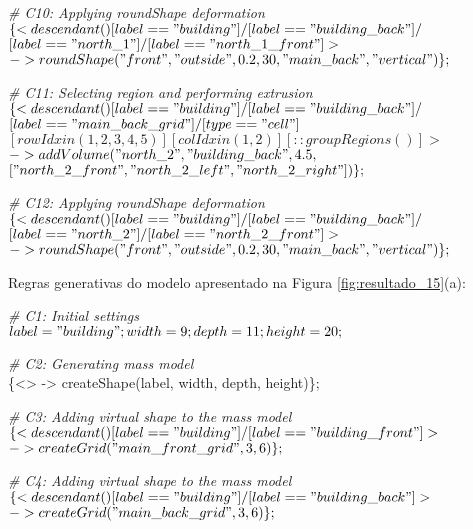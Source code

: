 \noindent \textit{\# C10: Applying roundShape deformation}\\
$\{< descendant() [label=="building"] / [label=="building\_back"] / $\\
$[label=="north\_1"] / [label=="north\_1\_front"] > $\\
$-> roundShape("front", "outside", 0.2, 30, "main\_back", "vertical")\};$

\noindent \textit{\# C11: Selecting region and performing extrusion}\\
$\{< descendant() [label=="building"] / [label=="building\_back"] / $\\
$[label=="main\_back\_grid"] / [type=="cell"] $\\
$[rowIdx in (1, 2, 3, 4, 5)] [colIdx in (1, 2)] [::groupRegions()] > $\\
$-> addVolume("north\_2", "building\_back", 4.5, $\\
$["north\_2\_front", "north\_2\_left", "north\_2\_right"])\};$

\noindent \textit{\# C12: Applying roundShape deformation}\\
$\{< descendant() [label=="building"] / [label=="building\_back"] / $\\
$[label=="north\_2"] / [label=="north\_2\_front"] > $\\
$-> roundShape("front", "outside", 0.2, 30, "main\_back", "vertical")\};$

\vspace{1cm}

Regras generativas do modelo apresentado na Figura \ref{fig:resultado_15}(a):

\noindent \textit{\# C1: Initial settings}\\
$label = "building"; width = 9; depth = 11; height = 20;$

\noindent \textit{\# C2: Generating mass model}\\
\{<> -> createShape(label, width, depth, height)\};

\noindent \textit{\# C3: Adding virtual shape to the mass model}\\
$\{< descendant() [label=="building"] / [label=="building\_front"] > $\\
$-> createGrid("main\_front\_grid", 3, 6)\};$

\noindent \textit{\# C4: Adding virtual shape to the mass model}\\
$\{< descendant() [label=="building"] / [label=="building\_back"] > $\\
$-> createGrid("main\_back\_grid", 3, 6)\};$

